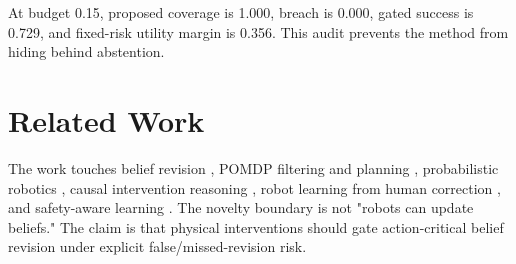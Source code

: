 \documentclass{article}
\begin{document}
At budget 0.15, proposed coverage is 1.000, breach is 0.000, gated success is 0.729, and fixed-risk utility margin is 0.356. This audit prevents the method from hiding behind abstention.

\clearpage
\section{Related Work}
The work touches belief revision \citep{agm1985}, POMDP filtering and planning \citep{kaelbling1998pomdp,ross2008pomdp}, probabilistic robotics \citep{thrun2005probabilistic}, causal intervention reasoning \citep{pearl2009causality}, robot learning from human correction \citep{argall2009survey,bajcsy2017corrections,dragan2013policy,hadfield2016cirl}, and safety-aware learning \citep{garcia2015safe,fisac2018safety}. The novelty boundary is not "robots can update beliefs." The claim is that physical interventions should gate action-critical belief revision under explicit false/missed-revision risk.
\end{document}
